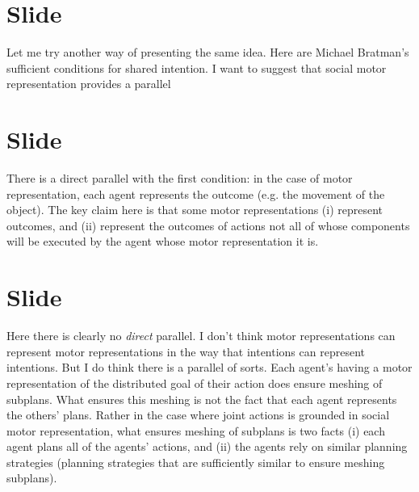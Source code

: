 \documentclass[12pt,\papersize]{extarticle}
\begin{document}
\section{Slide}
Let me try another way of presenting the same idea.
Here are Michael Bratman’s sufficient conditions for shared intention.
I want to suggest that social motor representation provides a parallel



\section{Slide}
There is a direct parallel with the first condition: in the case of motor representation, each agent represents the outcome (e.g. the movement of the object).
The key claim here is that some motor representations (i) represent outcomes, and (ii) represent the outcomes of actions not all of whose components will be executed by the agent whose motor representation it is.



\section{Slide}
Here there is clearly no \emph{direct} parallel. 
I don’t think motor representations can represent motor representations in the way that intentions can represent intentions.
But I do think there is a parallel of sorts.
Each agent’s having a motor representation of the distributed goal of their action does ensure meshing of subplans.
What ensures this meshing is not the fact that each agent represents the others’ plans.
Rather in the case where joint actions is grounded in social motor representation, what ensures meshing of subplans is two facts (i) each agent plans all of the agents’ actions, and (ii) the agents rely on similar planning strategies (planning strategies that are sufficiently similar to ensure meshing subplans).
\end{document}
